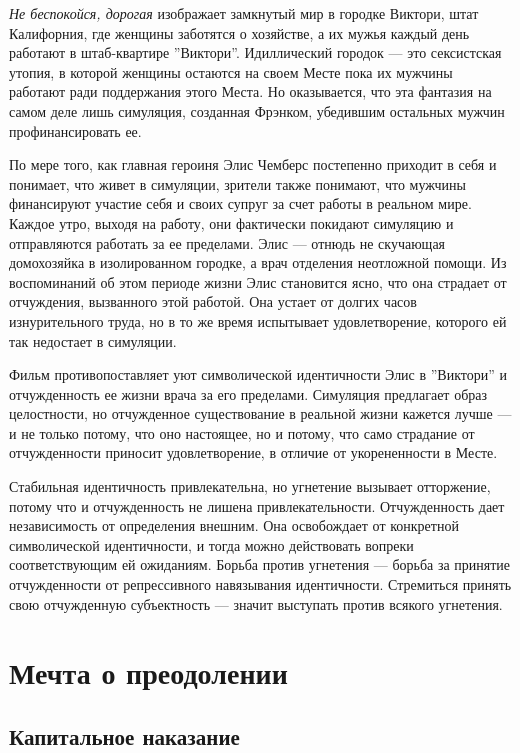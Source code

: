 \documentclass[12pt]{book}
\begin{document}
\textit{Не беспокойся, дорогая} изображает замкнутый мир в городке Виктори, штат Калифорния, где женщины заботятся о хозяйстве, а их мужья каждый день работают в штаб-квартире ''Виктори''. Идиллический городок --- это сексистская утопия, в которой женщины остаются на своем Месте пока их мужчины работают ради поддержания этого Места. Но оказывается, что эта фантазия на самом деле лишь симуляция, созданная Фрэнком, убедившим остальных мужчин профинансировать ее.

По мере того, как главная героиня Элис Чемберс постепенно приходит в себя и понимает, что живет в симуляции, зрители также понимают, что мужчины финансируют участие себя и своих супруг за счет работы в реальном мире. Каждое утро, выходя на работу, они фактически покидают симуляцию и отправляются работать за ее пределами. Элис --- отнюдь не скучающая домохозяйка в изолированном городке, а врач отделения неотложной помощи. Из воспоминаний об этом периоде жизни Элис становится ясно, что она страдает от отчуждения, вызванного этой работой. Она устает от долгих часов изнурительного труда, но в то же время испытывает удовлетворение, которого ей так недостает в симуляции.

Фильм противопоставляет уют символической идентичности Элис в ''Виктори'' и отчужденность ее жизни врача за его пределами. Симуляция предлагает образ целостности, но отчужденное существование в реальной жизни кажется лучше --- и не только потому, что оно настоящее, но и потому, что само страдание от отчужденности приносит удовлетворение, в отличие от укорененности в Месте.

Стабильная идентичность привлекательна, но угнетение вызывает отторжение, потому что и отчужденность не лишена привлекательности. Отчужденность дает независимость от определения внешним. Она освобождает от конкретной символической идентичности, и тогда можно действовать вопреки соответствующим ей ожиданиям. Борьба против угнетения --- борьба за принятие отчужденности от репрессивного навязывания идентичности. Стремиться принять свою отчужденную субъектность --- значит выступать против всякого угнетения.

\chapter{Мечта о преодолении}

\section{Капитальное наказание}
\end{document}
